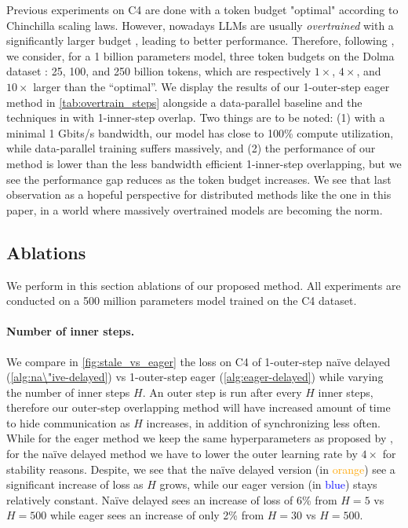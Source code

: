 Previous experiments on C4 are done with a token budget "optimal" according to Chinchilla scaling laws. However, nowadays LLMs are usually \textit{overtrained} with a significantly larger budget \citep{wortsman2023smallscaleproxieslargescaletransformer}, leading to better performance. Therefore, following \cite{douillard2025streamingdiloco}, we consider, for a 1 billion parameters model, three token budgets on the Dolma dataset \citep{soldaini2024dolmao}: 25, 100, and 250 billion tokens, which are respectively $1\times$, $4\times$, and $10\times$ larger than the ``optimal''. We display the results of our 1-outer-step eager method in \autoref{tab:overtrain_steps} alongside a data-parallel baseline and the techniques in \cite{douillard2025streamingdiloco} with 1-inner-step overlap. Two things are to be noted: (1) with a minimal 1 Gbits/s bandwidth, our model has close to 100\% compute utilization, while data-parallel training suffers massively, and (2) the performance of our method is lower than the less bandwidth efficient 1-inner-step overlapping, but we see the performance gap reduces as the token budget increases. We see that last observation as a hopeful perspective for distributed methods like the one in this paper, in a world where massively overtrained models are becoming the norm.



\subsection{Ablations}

We perform in this section ablations of our proposed method. All experiments are conducted on a 500 million parameters model trained on the C4 dataset.

\paragraph{Number of inner steps.} We compare in \autoref{fig:stale_vs_eager} the loss on C4 of 1-outer-step na\"ive delayed (\autoref{alg:na\"ive-delayed}) vs 1-outer-step eager (\autoref{alg:eager-delayed}) while varying the number of inner steps $H$. An outer step is run after every $H$ inner steps, therefore our outer-step overlapping method will have increased amount of time to hide communication as $H$ increases, in addition of synchronizing less often. While for the eager method we keep the same hyperparameters as proposed by \cite{fig:streaming_diloco}, for the na\"ive delayed method we have to lower the outer learning rate by $4\times$ for stability reasons. Despite, we see that the na\"ive delayed version (in \textcolor{orange}{orange}) see a significant increase of loss as $H$ grows, while our eager version (in \textcolor{blue}{blue}) stays relatively constant. Na\"ive delayed sees an increase of loss of 6\% from $H=5$ vs $H=500$ while eager sees an increase of only 2\% from $H=30$ vs $H=500$.

